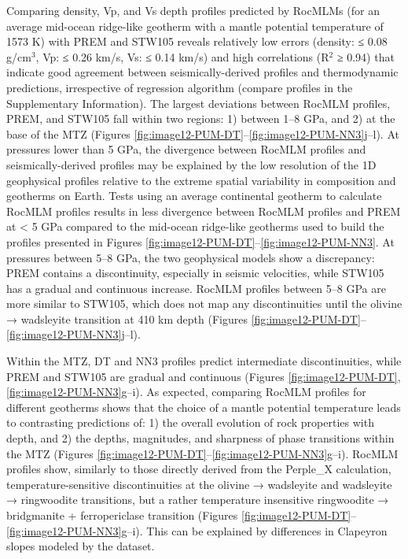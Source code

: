 \documentclass[draft,linenumbers]{agujournal2018}
\begin{document}
Comparing density, Vp, and Vs depth profiles predicted by RocMLMs (for an average mid-ocean ridge-like geotherm with a mantle potential temperature of 1573 K) with PREM and STW105 reveals relatively low errors (density: ≤ 0.08 g/cm\(^3\), Vp: ≤ 0.26 km/s, Vs: ≤ 0.14 km/s) and high correlations (R\(^2\) ≥ 0.94) that indicate good agreement between seismically-derived profiles and thermodynamic predictions, irrespective of regression algorithm (compare profiles in the Supplementary Information). The largest deviations between RocMLM profiles, PREM, and STW105 fall within two regions: 1) between 1--8 GPa, and 2) at the base of the MTZ (Figures \ref{fig:image12-PUM-DT}--\ref{fig:image12-PUM-NN3}j--l). At pressures lower than 5 GPa, the divergence between RocMLM profiles and seismically-derived profiles may be explained by the low resolution of the 1D geophysical profiles relative to the extreme spatial variability in composition and geotherms on Earth. Tests using an average continental geotherm to calculate RocMLM profiles results in less divergence between RocMLM profiles and PREM at \textless{} 5 GPa compared to the mid-ocean ridge-like geotherms used to build the profiles presented in Figures \ref{fig:image12-PUM-DT}--\ref{fig:image12-PUM-NN3}. At pressures between 5--8 GPa, the two geophysical models show a discrepancy: PREM contains a discontinuity, especially in seismic velocities, while STW105 has a gradual and continuous increase. RocMLM profiles between 5--8 GPa are more similar to STW105, which does not map any discontinuities until the olivine → wadsleyite transition at 410 km depth (Figures \ref{fig:image12-PUM-DT}--\ref{fig:image12-PUM-NN3}j--l).

Within the MTZ, DT and NN3 profiles predict intermediate discontinuities, while PREM and STW105 are gradual and continuous (Figures \ref{fig:image12-PUM-DT},\ref{fig:image12-PUM-NN3}g--i). As expected, comparing RocMLM profiles for different geotherms shows that the choice of a mantle potential temperature leads to contrasting predictions of: 1) the overall evolution of rock properties with depth, and 2) the depths, magnitudes, and sharpness of phase transitions within the MTZ (Figures \ref{fig:image12-PUM-DT}--\ref{fig:image12-PUM-NN3}g--i). RocMLM profiles show, similarly to those directly derived from the Perple\_X calculation, temperature-sensitive discontinuities at the olivine → wadsleyite and wadsleyite → ringwoodite transitions, but a rather temperature insensitive ringwoodite → bridgmanite + ferropericlase transition (Figures \ref{fig:image12-PUM-DT}--\ref{fig:image12-PUM-NN3}g--i). This can be explained by differences in Clapeyron slopes modeled by the \citet{stixrude2022} dataset.
\end{document}
